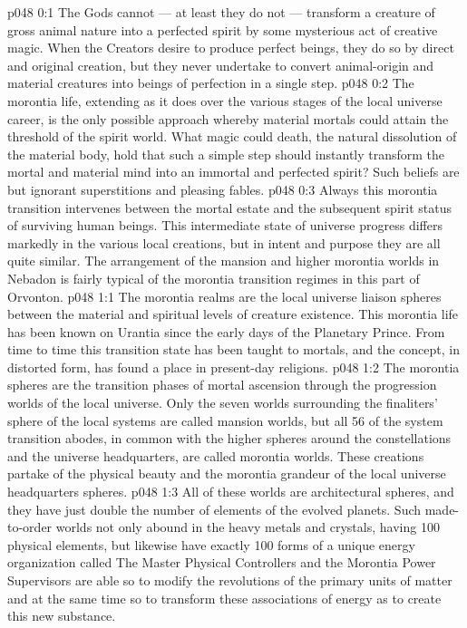 \author{Archangel}
\vs p048 0:1 The Gods cannot --- at least they do not --- transform a creature of gross animal nature into a perfected spirit by some mysterious act of creative magic. When the Creators desire to produce perfect beings, they do so by direct and original creation, but they never undertake to convert animal\hyp{}origin and material creatures into beings of perfection in a single step.
\vs p048 0:2 The morontia life, extending as it does over the various stages of the local universe career, is the only possible approach whereby material mortals could attain the threshold of the spirit world. What magic could death, the natural dissolution of the material body, hold that such a simple step should instantly transform the mortal and material mind into an immortal and perfected spirit? Such beliefs are but ignorant superstitions and pleasing fables.
\vs p048 0:3 Always this morontia transition intervenes between the mortal estate and the subsequent spirit status of surviving human beings. This intermediate state of universe progress differs markedly in the various local creations, but in intent and purpose they are all quite similar. The arrangement of the mansion and higher morontia worlds in Nebadon is fairly typical of the morontia transition regimes in this part of Orvonton.
\vs p048 1:1 The morontia realms are the local universe liaison spheres between the material and spiritual levels of creature existence. This morontia life has been known on Urantia since the early days of the Planetary Prince. From time to time this transition state has been taught to mortals, and the concept, in distorted form, has found a place in present\hyp{}day religions.
\vs p048 1:2 The morontia spheres are the transition phases of mortal ascension through the progression worlds of the local universe. Only the seven worlds surrounding the finaliters’ sphere of the local systems are called mansion worlds, but all 56 of the system transition abodes, in common with the higher spheres around the constellations and the universe headquarters, are called morontia worlds. These creations partake of the physical beauty and the morontia grandeur of the local universe headquarters spheres.
\vs p048 1:3 All of these worlds are architectural spheres, and they have just double the number of elements of the evolved planets. Such made\hyp{}to\hyp{}order worlds not only abound in the heavy metals and crystals, having 100 physical elements, but likewise have exactly 100 forms of a unique energy organization called  The Master Physical Controllers and the Morontia Power Supervisors are able so to modify the revolutions of the primary units of matter and at the same time so to transform these associations of energy as to create this new substance.
